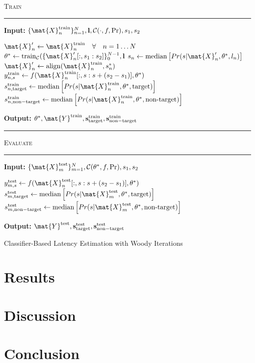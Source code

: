 \begin{algorithm}[H]
	\textsc{Train}
	\smallskip \hrule \smallskip
	\textbf{Input:} $\{\mat{X}_n^\mathrm{train}\}_{n=1}^N, \mathbf{l},
		\mathcal{C}(\cdot,f,\Pr), s_1, s_2$
	\begin{algorithmic}[1]
		\State $\mat{X}'_n \gets \mat{X}^\mathrm{train}_n \quad \forall \quad n=1\ldots
    N$
		\Repeat
		\State $\theta^* \gets \mathrm{train}_\mathcal{C}(\{\mat{X}'_n[:,s_1:s_2]\}_0^{N-1},\mathbf{l}$
    \State  $s_n \gets
			    \mathrm{median}\left[Pr(s|\mat{X}_n',\theta^*,l_n)\right]$
		\State $\mat{X}'_n \gets \mathrm{align}(\mat{X}^\mathrm{train}_n, s^*_n)$
		\EndFor
      \State $y_{n,s}^\mathrm{train} \gets
      f(\mat{X}_n^\mathrm{train}[:,s:s+(s_2-s_1)],\theta^*)$
        \EndFor
        \State $s_{n,\mathrm{target}}^\mathrm{train} \gets
			    \mathrm{median}\left[Pr(s|\mat{X}_n^\mathrm{train},\theta^*,\mathrm{target})\right]$
		    \State $s_{n,\mathrm{non-target}}^\mathrm{train}\gets
			    \mathrm{median}\left[Pr(s|\mat{X}_n^\mathrm{train},\theta^*,\textrm{non-target})\right]$
    \EndFor

	\end{algorithmic}
	\textbf{Output:} $\theta^*,
  \mat{Y}^\mathrm{train},
  \mathbf{s}_\mathrm{target}^\mathrm{train},
  \mathbf{s}_\mathrm{non-target}^\mathrm{train}$

	\smallskip \hrule \smallskip
	\textsc{Evaluate}
	\smallskip \hrule \smallskip
	\textbf{Input:} $\{\mat{X}_m^\mathrm{test}\}_{m=1}^N, \mathcal{C}(\theta^*,f, \Pr), s_1, s_2$
  \begin{algorithmic}[1]
      \State $y_{m,s}^\mathrm{test} \gets
      f(\mat{X}_n^\mathrm{test}[:,s:s+(s_2-s_1)],\theta^*)$
        \EndFor
        \State $s_{m,\mathrm{target}}^\mathrm{test} \gets
			    \mathrm{median}\left[Pr(s|\mat{X}_m^\mathrm{test},\theta^*,\mathrm{target})\right]$
		    \State $s_{m,\mathrm{non-target}}^\mathrm{test}\gets
			    \mathrm{median}\left[Pr(s|\mat{X}_m^\mathrm{test},\theta^*,\textrm{non-target})\right]$
    \EndFor
	\end{algorithmic}
  \textbf{Output:} $\mat{Y}^\mathrm{test},
  \mathbf{s}_\mathrm{target}^\mathrm{test},
  \mathbf{s}_\mathrm{non-target}^\mathrm{test}$
	\caption{Classifier-Based Latency Estimation with Woody Iterations}
	\label{alg:wcble}
\end{algorithm}

\section{Results}

\section{Discussion}

\section{Conclusion}
